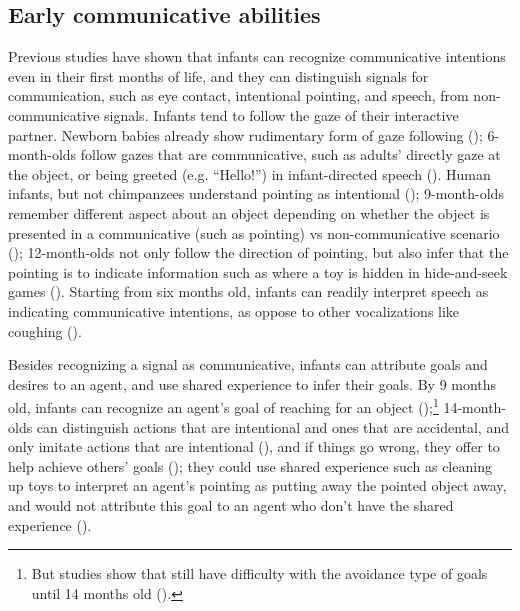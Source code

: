 \subsection{Early communicative abilities}
\label{sec:bg:acq:pre}
Previous studies have shown that infants can recognize communicative intentions even in their first months of life, and they can distinguish signals for communication, such as eye contact, intentional pointing, and speech, from non-communicative signals. Infants tend to follow the gaze of their interactive partner. Newborn babies already show rudimentary form of gaze following (\cite{farroni2004gaze}); 6-month-olds follow gazes that are communicative, such as adults' directly gaze at the object, or being greeted (e.g. ``Hello!'') in infant-directed speech (\cite{gredeback2008gaze, senju2008gaze}). Human infants, but not chimpanzees understand pointing as intentional (\cite{pika2006point, povinelli1997point,morissette1995joint}); 9-month-olds remember different aspect about an object depending on whether the object is presented in a communicative (such as pointing) vs non-communicative scenario (\cite{yoon2008intent}); 12-month-olds not only follow the direction of pointing, but also infer that the pointing is to indicate information such as where a toy is hidden in hide-and-seek games (\cite{behne2005hide,behne2012point}). Starting from six months old, infants can readily interpret speech as indicating communicative intentions, as oppose to other vocalizations like coughing (\cite{vouloumanos2014intent}).


Besides recognizing a signal as communicative, infants can attribute goals and desires to an agent, and use shared experience to infer their goals. By 9 months old, infants can recognize an agent's goal of reaching for an object (\cite{woodward1998goal,baldwin2001goal});\footnote{But studies show that still have difficulty with the avoidance type of goals until 14 months old (\cite{feiman2015goals}).} 14-month-olds can distinguish actions that are intentional and ones that are accidental, and only imitate actions that are intentional (\cite{carpenter1998intent,sakkalou2013goal}), and if things go wrong, they offer to help achieve others' goals (\cite{warneken2007goalrecog}); they could use shared experience such as cleaning up toys to interpret an agent's pointing as putting away the pointed object away, and would not attribute this goal to an agent who don't have the shared experience (\cite{liebal2009goal}).

